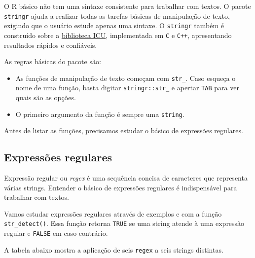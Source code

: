 \documentclass[]{book}
\providecommand{\tightlist}{%
  \setlength{\itemsep}{0pt}\setlength{\parskip}{0pt}}
\begin{document}
O R básico não tem uma sintaxe consistente para trabalhar com textos. O
pacote \texttt{stringr} ajuda a realizar todas as tarefas básicas de
manipulação de texto, exigindo que o usuário estude apenas uma sintaxe.
O \texttt{stringr} também é construído sobre a
\href{http://site.icu-project.org/}{biblioteca ICU}, implementada em
\texttt{C} e \texttt{C++}, apresentando resultados rápidos e confiáveis.

As regras básicas do pacote são:

\begin{itemize}
\tightlist
\item
  As funções de manipulação de texto começam com \texttt{str\_}. Caso
  esqueça o nome de uma função, basta digitar \texttt{stringr::str\_} e
  apertar \texttt{TAB} para ver quais são as opções.
\item
  O primeiro argumento da função é sempre uma \texttt{string}.
\end{itemize}

Antes de listar as funções, precisamos estudar o básico de expressões
regulares.

\subsection{Expressões regulares}\label{expressoes-regulares}

Expressão regular ou \emph{regex} é uma sequência concisa de caracteres
que representa várias strings. Entender o básico de expressões regulares
é indispensável para trabalhar com textos.

Vamos estudar expressões regulares através de exemplos e com a função
\texttt{str\_detect()}. Essa função retorna \texttt{TRUE} se uma string
atende à uma expressão regular e \texttt{FALSE} em caso contrário.

A tabela abaixo mostra a aplicação de seis \texttt{regex} a seis strings
distintas.
\end{document}
